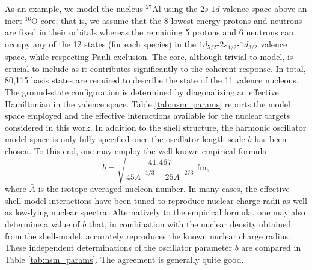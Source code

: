 \documentclass{book}[letterpaper,12pt]
\begin{document}
As an example, we model the nucleus $^{27}$Al using the $2s$-$1d$ valence space above an inert $^{16}$O core; that is, we assume that the 8 lowest-energy protons and neutrons are fixed in their orbitals whereas the remaining 5 protons and 6 neutrons can occupy any of the 12 states (for each species) in the $1d_{5/2}$-$2s_{1/2}$-$1d_{3/2}$ valence space, while respecting Pauli exclusion. The core, although trivial to model, is crucial to include as it contributes significantly to the coherent response. In total, 80,115 basis states are required to describe the state of the 11 valence nucleons. The ground-state configuration is determined by diagonalizing an effective Hamiltonian in the valence space. Table \ref{tab:nsm_params} reports the model space employed and the effective interactions available for the nuclear targets considered in this work. In addition to the shell structure, the harmonic oscillator model space is only fully specified once the oscillator length scale $b$ has been chosen. To this end, one may employ the well-known empirical formula
\begin{equation}
b=\sqrt{\frac{41.467}{45\bar{A}^{-1/3}-25\bar{A}^{-2/3}}}\;\mathrm{fm},
\label{eq:b_empirical}
\end{equation}
where $\bar{A}$ is the isotope-averaged nucleon number. In many cases, the effective shell model interactions have been tuned to reproduce nuclear charge radii as well as low-lying nuclear spectra. Alternatively to the empirical formula, one may also determine a value of $b$ that, in combination with the nuclear density obtained from the shell-model, accurately reproduces the known nuclear charge radius. These independent determinations of the oscillator parameter $b$ are compared in Table \ref{tab:nsm_params}. The agreement is generally quite good.
\end{document}
